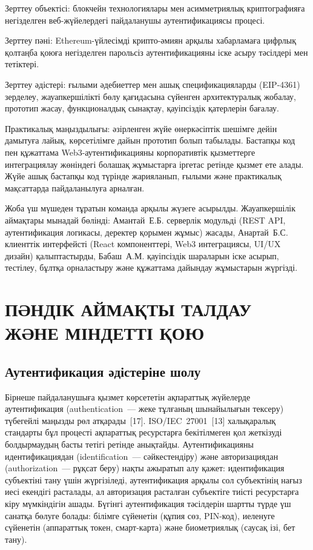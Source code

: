 \documentclass[14pt,a4paper]{extarticle}
\begin{document}
Зерттеу объектісі: блокчейн технологиялары мен асимметриялық криптографияға негізделген веб-жүйелердегі пайдаланушы аутентификациясы процесі.

Зерттеу пәні: Ethereum-үйлесімді крипто-әмиян арқылы хабарламаға цифрлық қолтаңба қоюға негізделген парольсіз аутентификацияны іске асыру тәсілдері мен тетіктері.

Зерттеу әдістері: ғылыми әдебиеттер мен ашық спецификацияларды (EIP-4361) зерделеу, жауапкершілікті бөлу қағидасына сүйенген архитектуралық жобалау, прототип жасау, функционалдық сынақтау, қауіпсіздік қатерлерін бағалау.

Практикалық маңыздылығы: әзірленген жүйе өнеркәсіптік шешімге дейін дамытуға лайық, көрсетілімге дайын прототип болып табылады. Бастапқы код пен құжаттама Web3-аутентификацияны корпоративтік қызметтерге интеграциялау жөніндегі болашақ жұмыстарға іргетас ретінде қызмет ете алады. Жүйе ашық бастапқы код түрінде жарияланып, ғылыми және практикалық мақсаттарда пайдаланылуға арналған.

Жоба үш мүшеден тұратын команда арқылы жүзеге асырылды. Жауапкершілік аймақтары мынадай бөлінді: Амантай~Е.Б. серверлік модульді (REST API, аутентификация логикасы, деректер қорымен жұмыс) жасады, Анартай~Б.С. клиенттік интерфейсті (React компоненттері, Web3 интеграциясы, UI/UX дизайн) қалыптастырды, Бабаш~А.М. қауіпсіздік шараларын іске асырып, тестілеу, бұлтқа орналастыру және құжаттама дайындау жұмыстарын жүргізді.

\newpage
\section{ПӘНДІК АЙМАҚТЫ ТАЛДАУ ЖӘНЕ МІНДЕТТІ ҚОЮ}

\subsection{Аутентификация әдістеріне шолу}

Бірнеше пайдаланушыға қызмет көрсететін ақпараттық жүйелерде аутентификация (authentication~--- жеке тұлғаның шынайылығын тексеру) түбегейлі маңызды рөл атқарады~[17]. ISO/IEC~27001~[13] халықаралық стандарты бұл процесті ақпараттық ресурстарға бекітілмеген қол жеткізуді болдырмаудың басты тетігі ретінде анықтайды. Аутентификацияны идентификациядан (identification~--- сәйкестендіру) және авторизациядан (authorization~--- рұқсат беру) нақты ажыратып алу қажет: идентификация субъектіні тану үшін жүргізіледі, аутентификация арқылы сол субъектінің нағыз иесі екендігі расталады, ал авторизация расталған субъектіге тиісті ресурстарға кіру мүмкіндігін ашады. Бүгінгі аутентификация тәсілдерін шартты түрде үш санатқа бөлуге болады: білімге сүйенетін (құпия сөз, PIN-код), иеленуге сүйенетін (аппараттық токен, смарт-карта) және биометриялық (саусақ ізі, бет тану).
\end{document}

